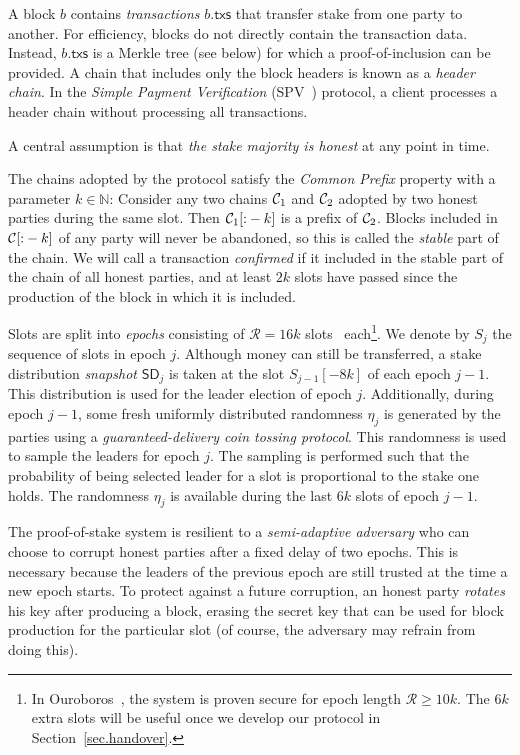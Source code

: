 A block $b$ contains \emph{transactions} $b\textsf{.txs}$ that transfer stake from one party to another.
For efficiency, blocks do not directly contain the transaction data. Instead, $b\textsf{.txs}$
is a Merkle tree (see below) for which a proof-of-inclusion can be provided.
A chain that includes only the block headers is known as a \emph{header chain}.
In the \emph{Simple Payment Verification} (SPV~\cite{bitcoin}) protocol, a client
processes a header chain without processing all transactions.

A central assumption is that \emph{the stake majority is honest} at any point in
time.

The chains adopted by the protocol satisfy the \emph{Common Prefix} property
with a parameter $k \in \mathbb{N}$:
Consider any two chains $\mathcal{C}_1$ and $\mathcal{C}_2$ adopted by two honest parties
during the same slot. Then $\mathcal{C}_1[{:}-k]$ is a prefix of $\mathcal{C}_2$.
Blocks included in $\mathcal{C}[{:}-k]$ of any party will never be abandoned,
so this is called the \emph{stable} part of the chain. We will call a
transaction \emph{confirmed} if it included in the stable part of the
chain of all honest parties, and at least $2k$ slots have passed since
the production of the block in which it is included.

Slots are split into \emph{epochs} consisting of $\mathcal{R} = 16k$
slots~\cite{pos-sidechains} each\footnote{In Ouroboros~\cite{ouroboros},
the system is proven secure for epoch length $\mathcal{R} \geq 10k$.
The $6k$ extra slots will
be useful once we develop our protocol in Section~\ref{sec.handover}.}.
We denote by $S_j$ the sequence of slots in epoch $j$.
Although money can still be transferred, a stake distribution \emph{snapshot} $\textsf{SD}_j$
is taken at the slot $S_{j-1}[-8k]$ of each epoch $j-1$. This distribution is
used for the leader election of epoch $j$. Additionally, during epoch $j-1$, some fresh
uniformly distributed randomness $\eta_j$ is generated by the parties using a \emph{guaranteed-delivery
coin tossing protocol}. This randomness is used to sample the leaders for epoch
$j$. The sampling is performed such that the probability of being selected leader
for a slot is proportional to the stake one holds. The randomness $\eta_j$ is available
during the last $6k$ slots of epoch $j-1$. 

The proof-of-stake system is resilient to a \emph{semi-adaptive adversary} who can
choose to corrupt honest parties after a fixed delay of two epochs. This is necessary
because the leaders of the previous epoch are still trusted at the time a new epoch
starts. To protect against a future corruption, an honest party \emph{rotates} his
key after producing a block, erasing the secret key that can be used for block
production for the particular slot (of course, the adversary may refrain from doing
this).

